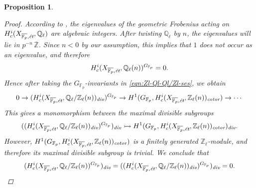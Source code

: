 \documentclass[leqno,12pt]{article}
\theoremstyle{plain}
\newtheorem{proposition}[theorem]{\indent\sc Proposition}
\theoremstyle{definition}
\newcommand{\FF}{\mathbb{F}}
\newcommand{\QQ}{\mathbb{Q}}
\newcommand{\ZZ}{\mathbb{Z}}
\renewcommand{\div}{\text{\it div}}
\newcommand{\cotor}{\text{\it cotor}}
\begin{document}
\begin{proposition}
\begin{proof}
    According to \cite[Expos\'{e}~XXI, 5.5.3]{SGA7}, the eigenvalues of the
    geometric Frobenius acting on
    $H^i_c (X_{\overline{\FF_p},\text{\it \'{e}t}}, \QQ_\ell)$ are algebraic
    integers. After twisting $\QQ_\ell$ by $n$, the eigenvalues will lie in
    $p^{-n}\,\overline{\ZZ}$. Since $n < 0$ by our assumption, this implies
    that $1$ does not occur as an eigenvalue, and therefore
    $$H^i_c (X_{\overline{\FF_p},\text{\it \'{e}t}}, \QQ_\ell (n))^{G_{\FF_p}} = 0.$$
    Hence after taking the $G_{\FF_p}$-invariants in
    \eqref{eqn:Zl-Ql-Ql/Zl-ses}, we obtain
    \[
      0 \to (H^i_c (X_{\overline{\FF_p},\text{\it \'{e}t}}, \QQ_\ell/\ZZ_\ell (n))_\div)^{G_{\FF_p}} \to
      H^1 (G_{\FF_p}, H^i_c (X_{\overline{\FF_p},\text{\it \'{e}t}}, \ZZ_\ell (n))_\cotor) \to \cdots
    \]
    This gives a monomorphism between the maximal divisible subgroups
    \[ ((H^i_c (X_{\overline{\FF_p},\text{\it \'{e}t}}, \QQ_\ell/\ZZ_\ell (n))_\div)^{G_{\FF_p}})_\div \rightarrowtail
    H^1 (G_{\FF_p}, H^i_c (X_{\overline{\FF_p},\text{\it \'{e}t}}, \ZZ_\ell (n))_\cotor)_\div. \]
    However,
    $H^1 (G_{\FF_p}, H^i_c (X_{\overline{\FF_p},\text{\it \'{e}t}}, \ZZ_\ell (n))_\cotor)$
    is a finitely generated $\ZZ_\ell$-module, and therefore its
    maximal divisible subgroup is trivial. We conclude that
    \[ (H^i_c (X_{\overline{\FF_p},\text{\it \'{e}t}}, \QQ_\ell/\ZZ_\ell (n))^{G_{\FF_p}})_\div =
      ((H^i_c (X_{\overline{\FF_p},\text{\it \'{e}t}}, \QQ_\ell/\ZZ_\ell (n))_\div)^{G_{\FF_p}})_\div = 0. \qedhere \]
  \end{proof}
\end{proposition}
\end{document}
